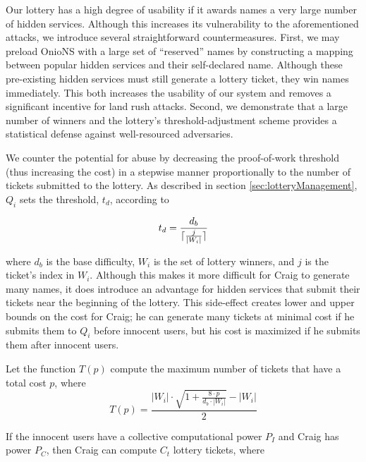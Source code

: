 \documentclass[USenglish,oneside,twocolumn]{article}
\DeclarePairedDelimiter{\ceil}{\lceil}{\rceil}
\newcommand*\nWinners{\left\vert{W_{i}}\right\vert}
\begin{document}
Our lottery has a high degree of usability if it awards names a very large number of hidden services. Although this increases its vulnerability to the aforementioned attacks, we introduce several straightforward countermeasures. First, we may preload OnioNS with a large set of ``reserved'' names by constructing a mapping between popular hidden services and their self-declared name. Although these pre-existing hidden services must still generate a lottery ticket, they win names immediately. This both increases the usability of our system and removes a significant incentive for land rush attacks. Second, we demonstrate that a large number of winners and the lottery's threshold-adjustment scheme provides a statistical defense against well-resourced adversaries.

We counter the potential for abuse by decreasing the proof-of-work threshold (thus increasing the cost) in a stepwise manner proportionally to the number of tickets submitted to the lottery. As described in section \ref{sec:lotteryManagement}, $ Q_{i} $ sets the threshold, $ t_{d} $, according to 

\begin{equation}
	t_{d} = \frac{d_{b}}{\ceil{\frac{j}{\nWinners}}}
\end{equation}

\noindent where $ d_{b} $ is the base difficulty, $ W_{i} $ is the set of lottery winners, and $ j $ is the ticket's index in $ W_{i} $. Although this makes it more difficult for Craig to generate many names, it does introduce an advantage for hidden services that submit their tickets near the beginning of the lottery. This side-effect creates lower and upper bounds on the cost for Craig; he can generate many tickets at minimal cost if he submits them to $ Q_{i} $ before innocent users, but his cost is maximized if he submits them after innocent users.

Let the function $ T(p) $ compute the maximum number of tickets that have a total cost $ p $, where
\begin{equation}
	T(p) = \frac{\nWinners \cdot \sqrt{1 + \frac{8 \cdot p}{d_{b} \cdot \nWinners}} - \nWinners}{2}
	\label{eq:nTickets}
\end{equation}

If the innocent users have a collective computational power $ P_{I} $ and Craig has power $ P_{C} $, then Craig can compute $ C_{t} $ lottery tickets, where
\end{document}
